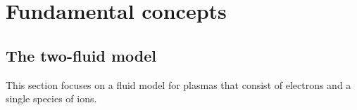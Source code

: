 \documentclass[a4paper,11pt]{report}
\begin{document}
\chapter{Fundamental concepts}

\section{The two-fluid model}
This section focuses on a fluid model for plasmas that consist of electrons and a single species of ions.

\end{document}
